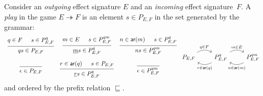 \documentclass[acmsmall,nonacm]{acmart}
\newcommand{\kw}[1]{\ensuremath{ \mathsf{#1} }}
\begin{document}
\begin{definition}[Strategy] \label{def:strat} %
Consider an \emph{outgoing} effect signature $E$
and an \emph{incoming} effect signature~$F$.
A \emph{play} in the game $E \twoheadrightarrow F$
is an element $s \in P_{E,F}$
in the set generated by the grammar:
\[
  \begin{array}{cccc}
  \begin{prooftree}
    \hypo{q \in F}
    \hypo{s \in P_{E,F}^q}
    \infer2{qs \in P_{E,F}}
  \end{prooftree}
  &
  \begin{prooftree}
    \hypo{m \in E}
    \hypo{s \in P_{E,F}^{qm}}
    \infer2{\underline{m}s \in P_{E,F}^q}
  \end{prooftree}
  &
  \begin{prooftree}
    \hypo{n \in \kw{ar}(m)}
    \hypo{s \in P_{E,F}^q}
    \infer2{ns \in P_{E,F}^{qm}}
  \end{prooftree}
  \\[2em]
  \begin{prooftree}
    \infer0{\epsilon \in P_{E,F}}
  \end{prooftree}
  &
  \begin{prooftree}
    \hypo{r \in \kw{ar}(q)}
    \hypo{s \in P_{E,F}}
    \infer2{\underline{r}s \in P_{E,F}^q}
  \end{prooftree}
  &
  \begin{prooftree}
    \infer0{\epsilon \in P_{E,F}^{qm}}
  \end{prooftree}
  \end{array}
  \begin{tikzcd}
    P_{E,F} \ar[r, bend left, "q \in F"] &
    P_{E,F}^q \ar[r, bend left, "m \in E"] \ar[l, bend left, "r \in \kw{ar}(q)"] &
    P_{E,F}^{qm} \ar[l, bend left, "n \in \kw{ar}(m)"]
  \end{tikzcd}
%
\]
and ordered by the prefix relation $\sqsubseteq$.

\end{definition}
\end{document}
